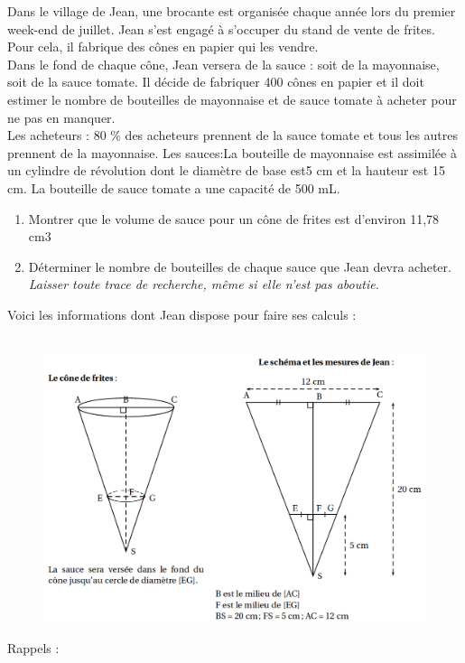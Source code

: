 \documentclass[11pt]{article}
\begin{document}
\begin{multicols}{2}

  Dans le village de Jean, une brocante est organisée chaque année lors du premier week-end de juillet. Jean s’est engagé à s’occuper du stand de vente de frites. Pour cela, il fabrique des cônes en papier qui les vendre. \\
  Dans le fond de chaque cône, Jean versera de la sauce : soit de la mayonnaise, soit de la sauce tomate. 
  Il décide de fabriquer 400 cônes en papier et il doit estimer le nombre de bouteilles de mayonnaise et de sauce tomate à acheter pour ne pas en manquer. \\

  Les acheteurs : 80 \% des acheteurs prennent de la sauce tomate et tous les autres prennent de la mayonnaise. Les sauces:La bouteille de mayonnaise est assimilée à un cylindre de révolution dont le diamètre de base est5 cm et la hauteur est 15 cm. La bouteille de sauce tomate a une capacité de 500 mL.

  \begin{enumerate}
  \item Montrer que le volume de sauce pour un cône de frites est d’environ 11,78 cm3
  \item Déterminer le nombre de bouteilles de chaque sauce que Jean devra acheter. \\
    \textit{Laisser toute trace de recherche, même si elle n’est pas aboutie.} \\
  \end{enumerate}

  Voici les informations dont Jean dispose pour faire ses calculs :

  \begin{figure}[H]
        \centering
        \includegraphics[width=\linewidth]{3x3-volumes-1/sources/sauce.png}
  \end{figure}
  Rappels : 


\end{multicols}
\end{document}
